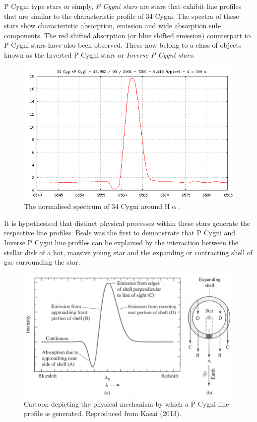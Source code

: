 P Cygni type stars or simply, \emph{P Cygni stars} are stars that exhibit line profiles that are similar to the characteristic profile of 34 Cygni. The spectra of these stars show characteristic absorption, emission and wide absorption sub-components\cite{zhang2021catalog}. The red shifted absorption (or blue shifted emission) counterpart to P Cygni stars have also been observed. These now belong to a class of objects known as the Inverted P Cygni stars or \emph{Inverse P Cygni stars}. 

\begin{figure}[!htb]
\centering
\includegraphics[scale=.40]{figures/34cygni.png}
\caption{The normalised spectrum of 34 Cygni around H$\upalpha$.}
\end{figure}

It is hypothesised that distinct physical processes within these stars generate the respective line profiles\cite{hou2016catalog}. Beals was the first to demonstrate that P Cygni and Inverse P Cygni line profiles can be explained by the interaction between the stellar disk of a hot, massive young star and the expanding or contracting shell of gas surrounding the star\cite{1953PDAO....9....1B}. 

\begin{figure}[!htb]
\centering
\includegraphics[scale=.40]{figures/expandingpcygni.png}
\caption{Cartoon depicting the physical mechanism by which a P Cygni line profile is generated. Reproduced from Kasai (2013)\cite{kasai2013type}.}
\end{figure}

